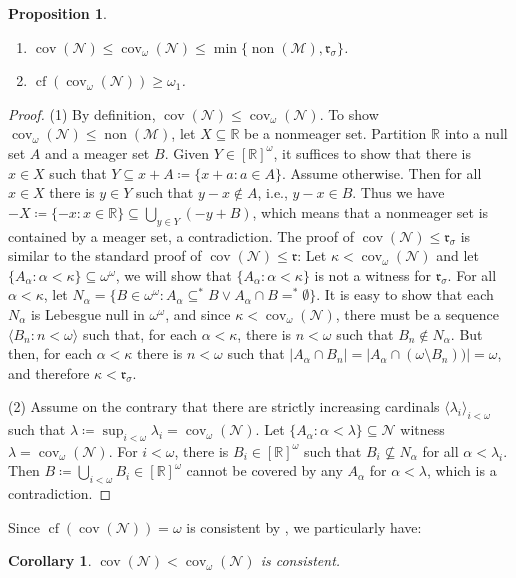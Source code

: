 \documentclass[a4paper,12pt]{amsart}
\newtheorem{prop}[thm]{Proposition}
\newtheorem{cor}[thm]{Corollary}
\theoremstyle{definition}
\numberwithin{thm}{section}
\numberwithin{equation}{section}
\renewcommand{\a}{\alpha}
\newcommand{\br}{\mathbb{R}}
\newcommand{\rr}{\mathfrak{r}}
\newcommand{\n}{\mathcal{N}}
\DeclareMathOperator{\non}{non}
\DeclareMathOperator{\cov}{cov}
\newcommand{\nonm}{\non(\mathcal{M})}
\newcommand{\covn}{\cov(\mathcal{N})}
\DeclareMathOperator{\cf}{cf}
\newcommand{\covomn}{\operatorname{cov}_\omega(\mathcal{N})}
\newcommand{\Baire}{\omega^{\omega}}
\begin{document}
    \begin{prop}\leavevmode
        \begin{enumerate}
            \item $\covn\leq\covomn\leq\min\{\nonm, \rr_\sigma\}$.
            \item $\cf(\covomn)\geq\omega_1$.
        \end{enumerate}
    \end{prop}
    \begin{proof}
        (1) By definition, $\covn\leq\covomn$. To show $\covomn\leq\nonm$, let $X\subseteq\br$ be a nonmeager set. Partition $\br$ into a null set $A$ and a meager set $B$. Given $Y\in[\br]^\omega$, it suffices to show that there is $x\in X$ such that $Y\subseteq x+A\coloneqq\{x+a:a\in A\}$. Assume otherwise. Then for all $x\in X$ there is $y\in Y$ such that $y-x\notin A$, i.e., $y-x\in B$. Thus we have $-X\coloneqq\{-x:x\in\br\}\subseteq\bigcup_{y\in Y}(-y+B)$, which means that a nonmeager set is contained by a meager set, a contradiction.
        The proof of $\covn\leq\rr_\sigma$ is similar to the standard proof of $\covn\leq\rr$: Let $\kappa < \covomn$ and let $\{ A_\alpha : \alpha < \kappa \} \subseteq \Baire$, we will show that $\{ A_\alpha : \alpha < \kappa \}$ is not a witness for $\rr_\sigma$. For all $\alpha < \kappa$, let $N_\alpha = \{ B \in \Baire : A_\alpha \subseteq^* B \lor A_\alpha \cap B =^* \emptyset \}$. It is easy to show that each $N_\alpha$ is Lebesgue null in $\omega^\omega$, and since $\kappa < \covomn$, there must be a sequence $\langle B_n : n < \omega \rangle$ such that, for each $\alpha<\kappa$, there is $n<\omega$ such that $B_n \notin N_\alpha$. But then, for each $\alpha < \kappa$ there is $n < \omega$ such that $|A_\alpha \cap B_n| = |A_\alpha \cap (\omega \setminus B_n))| = \omega$, and therefore $\kappa < \rr_\sigma$.

        (2) Assume on the contrary that there are strictly increasing cardinals $\langle\lambda_i\rangle_{i<\omega}$ such that $\lambda\coloneqq\sup_{i<\omega}\lambda_i=\covomn$. Let $\{A_\a:\a<\lambda\}\subseteq\n$ witness $\lambda=\covomn$. For $i<\omega$, there is $B_i\in[\mathbb{R}]^\omega$ such that $B_i\nsubseteq N_\a$ for all $\a<\lambda_i$. Then $B\coloneq\bigcup_{i<\omega}B_i \in[\mathbb{R}]^\omega$ cannot be covered by any $A_\a$ for $\a<\lambda$, which is a contradiction.
    \end{proof}

    Since $\cf(\covn)=\omega$ is consistent by \cite{She00}, we particularly have:
    \begin{cor}
        $\covn<\covomn$ is consistent.
    \end{cor}
\end{document}
